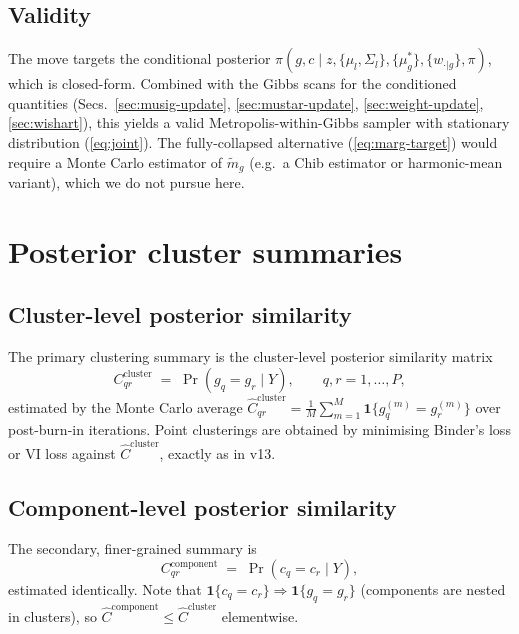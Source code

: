 \documentclass[11pt]{article}
\newcommand{\ind}{\mathbf{1}}
\begin{document}
\subsection{Validity}

The move targets the conditional posterior
$\pi(g,c\mid z,\{\mu_l,\Sigma_l\},\{\mu_g^*\},\{w_{\cdot|g}\},\pi)$,
which is closed-form. Combined with the Gibbs scans for the conditioned
quantities (Secs.~\ref{sec:musig-update}, \ref{sec:mustar-update},
\ref{sec:weight-update}, \ref{sec:wishart}), this yields a valid
Metropolis-within-Gibbs sampler with stationary distribution
(\ref{eq:joint}). The fully-collapsed alternative (\ref{eq:marg-target})
would require a Monte Carlo estimator of $\widetilde m_g$ (e.g.\ a Chib
estimator or harmonic-mean variant), which we do not pursue here.

\section{Posterior cluster summaries}
\label{sec:summaries}

\subsection{Cluster-level posterior similarity}

The primary clustering summary is the cluster-level posterior similarity
matrix
\begin{equation}
C_{qr}^{\mathrm{cluster}} \;=\; \Pr(g_q=g_r\mid Y),
\qquad q,r=1,\ldots,P,
\label{eq:Ccluster}
\end{equation}
estimated by the Monte Carlo average
$\widehat C_{qr}^{\mathrm{cluster}}=\frac{1}{M}\sum_{m=1}^M\ind\{g_q^{(m)}=g_r^{(m)}\}$
over post-burn-in iterations. Point clusterings are obtained by
minimising Binder's loss or VI loss against $\widehat C^{\mathrm{cluster}}$,
exactly as in v13.

\subsection{Component-level posterior similarity}

The secondary, finer-grained summary is
\begin{equation}
C_{qr}^{\mathrm{component}} \;=\; \Pr(c_q=c_r\mid Y),
\label{eq:Ccomponent}
\end{equation}
estimated identically. Note that
$\ind\{c_q=c_r\}\Rightarrow\ind\{g_q=g_r\}$ (components are nested in
clusters), so $\widehat C^{\mathrm{component}}\le \widehat C^{\mathrm{cluster}}$
elementwise.
\end{document}
